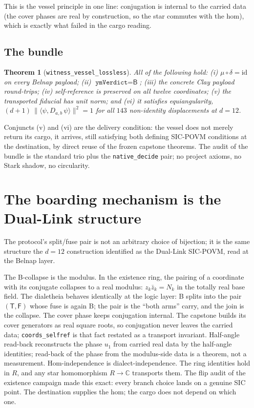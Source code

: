 \documentclass[12pt,a4paper]{article}
\newtheorem{theorem}{Theorem}[section]
\newcommand{\bT}{\textsf{T}}
\newcommand{\bF}{\textsf{F}}
\newcommand{\bB}{\textsf{B}}
\begin{document}
This is the vessel principle in one line: conjugation is internal to the carried
data (the cover phases are real by construction, so the star commutes with the
hom), which is exactly what failed in the cargo reading.

\subsection{The bundle}

\begin{theorem}[\texttt{witness\_vessel\_lossless}]
\label{thm:bundle}
All of the following hold:
(i) $\mu \circ \delta = \mathrm{id}$ on every Belnap payload;
(ii) $\texttt{ymVerdict} = \bB$;
(iii) the concrete Clay payload round-trips;
(iv) self-reference is preserved on all twelve coordinates;
(v) the transported fiducial has unit norm; and
(vi) it satisfies equiangularity,
$(d+1)\,\lVert\langle\psi, D_{a,b}\,\psi\rangle\rVert^2 = 1$
for all $143$ non-identity displacements at $d = 12$.
\end{theorem}

Conjuncts (v) and (vi) are the delivery condition: the vessel does not merely
return its cargo, it arrives, still satisfying both defining SIC-POVM conditions
at the destination, by direct reuse of the frozen capstone theorems.  The audit
of the bundle is the standard trio plus the \texttt{native\_decide} pair; no
project axioms, no Stark shadow, no circularity.

\section{The boarding mechanism is the Dual-Link structure}
\label{sec:duallink}

The protocol's split/fuse pair is not an arbitrary choice of bijection; it is
the same structure the $d=12$ construction identified as the Dual-Link
SIC-POVM, read at the Belnap layer.

The B-collapse is the modulus.  In the existence ring, the pairing of a
coordinate with its conjugate collapses to a real modulus:
$z_k \bar{z}_k = N_k$ in the totally real base field.  The dialetheia behaves
identically at the logic layer: \bB{} splits into the pair $(\bT, \bF)$ whose
fuse is again \bB{}; the pair is the ``both arms'' carry, and the join is the
collapse.  The cover phase keeps conjugation internal.  The capstone builds its
cover generators as real square roots, so conjugation never leaves the carried
data; \texttt{coords\_selfref} is that fact restated as a transport invariant.
Half-angle read-back reconstructs the phase $u_1$ from carried real data by the
half-angle identities; read-back of the phase from the modulus-side data is a
theorem, not a measurement.  Hom-independence is dialect-independence.  The
ring identities hold in $R$, and any star homomorphism $R \to \mathbb{C}$
transports them.  The flip audit of the existence campaign made this exact:
every branch choice lands on a genuine SIC point.  The destination supplies the
hom; the cargo does not depend on which one.
\end{document}
